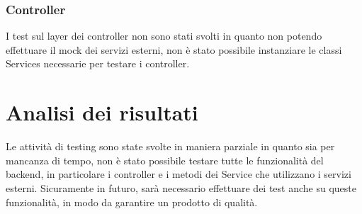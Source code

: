 \subsubsection{Controller}
I test sul layer dei controller non sono stati svolti in quanto non potendo effettuare il mock dei servizi esterni, non è stato possibile instanziare le classi Services necessarie per testare i controller.\\

\section{Analisi dei risultati}
Le attività di testing sono state svolte in maniera parziale in quanto sia per mancanza di tempo, non è stato possibile testare tutte le funzionalità del backend, in particolare i controller e i metodi dei Service che utilizzano i servizi esterni. Sicuramente in futuro, sarà necessario effettuare dei test anche su queste funzionalità, in modo da garantire un prodotto di qualità.\\ 
